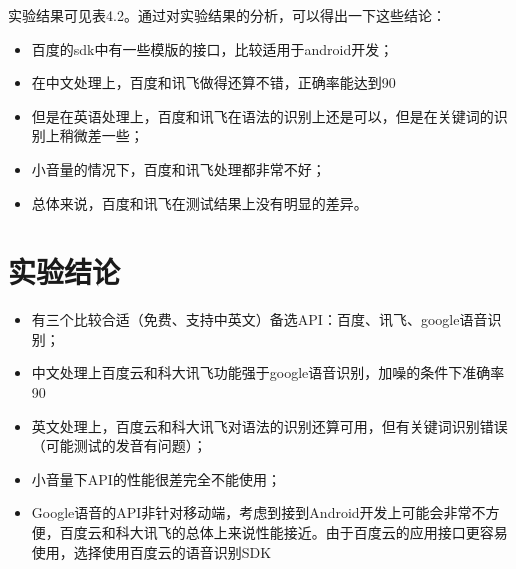 实验结果可见表4.2。通过对实验结果的分析，可以得出一下这些结论：

\begin{itemize}
\item 百度的sdk中有一些模版的接口，比较适用于android开发；
\item	在中文处理上，百度和讯飞做得还算不错，正确率能达到90%
\item 但是在英语处理上，百度和讯飞在语法的识别上还是可以，但是在关键词的识别上稍微差一些；
\item 小音量的情况下，百度和讯飞处理都非常不好；
\item 总体来说，百度和讯飞在测试结果上没有明显的差异。
\end{itemize}

\section{实验结论}

\begin{itemize}
\item 有三个比较合适（免费、支持中英文）备选API：百度、讯飞、google语音识别；
\item	中文处理上百度云和科大讯飞功能强于google语音识别，加噪的条件下准确率90%
\item 英文处理上，百度云和科大讯飞对语法的识别还算可用，但有关键词识别错误（可能测试的发音有问题）；
\item 小音量下API的性能很差完全不能使用；
\item Google语音的API非针对移动端，考虑到接到Android开发上可能会非常不方便，百度云和科大讯飞的总体上来说性能接近。由于百度云的应用接口更容易使用，选择使用百度云的语音识别SDK
\end{itemize}
